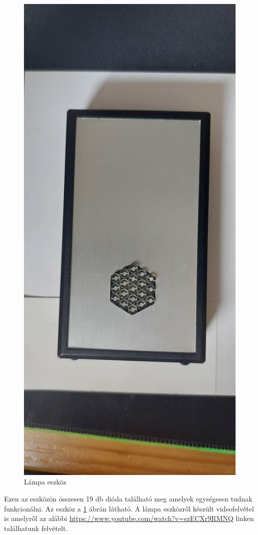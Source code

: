 \documentclass[tocnopagenum]{thesis-ekf}
\theoremstyle{definition}
\theoremstyle{remark}
\begin{document}
	\begin{figure}[H]	
		\centering
		\includegraphics[scale=0.10]{lamp01}
		\caption[Lámpa eszköz]{Lámpa eszköz}
		\label{fig:lamp01}
	\end{figure}
	Ezen az eszközön összesen 19 db dióda található meg amelyek egységesen tudnak funkcionálni. 
	Az eszköz a \ref{fig:lamp01} ábrán látható.
	A lámpa eszközről készült videofelvétel is amelyről az alábbi \url{https://www.youtube.com/watch?v=szECXr9RMNQ} linken találhatunk felvételt.
\end{document}
